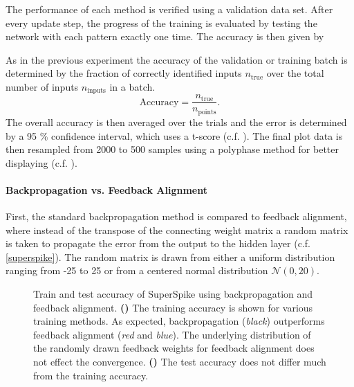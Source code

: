 The performance of each method is verified using a validation data set. After every update step, the progress of the training is evaluated by testing the network with each pattern exactly one time. The accuracy is then given by 

As in the previous experiment the accuracy of the validation or training batch is determined by the fraction of correctly identified inputs $n_\text{true}$ over the total number of inputs $n_\text{inputs}$ in a batch.
\begin{equation}
\text{Accuracy} = \frac{n_\text{true}}{n_\text{points}}.
\end{equation}
The overall accuracy is then averaged over the trials and the error is determined by a 95 \% confidence interval, which uses a t-score (c.f. \citealp{Smithson2011}). The final plot data is then resampled from 2000 to 500 samples using a polyphase method for better displaying (c.f. \citealp{scipypolyresample}).

\paragraph{Backpropagation vs. Feedback Alignment}
First, the standard backpropagation method is compared to feedback alignment, where instead of the transpose of the connecting weight matrix a random matrix is taken to propagate the error from the output to the hidden layer (c.f. \cref{superspike}). The random matrix is drawn from either a uniform distribution ranging from -25 to 25 or from a centered normal distribution $\mathcal{N}(0, 20)$.

\begin{figure}
	\begin{subfigure}[c]{0.5\textwidth}
		\centering
		\caption{}
		
		\label{bptrain73}
	\end{subfigure}	
	\begin{subfigure}[c]{0.5\textwidth}
		\centering
		\caption{}
		
		\label{bptest73}
	\end{subfigure}
	\caption[Train and test accuracy of SuperSpike using backpropagation and feedback alignment.]{Train and test accuracy of SuperSpike using backpropagation and feedback alignment. \textbf{()} The training accuracy is shown for various training methods. As expected, backpropagation (\textit{black}) outperforms feedback alignment (\textit{red} and \textit{blue}). The underlying distribution of the randomly drawn feedback weights for feedback alignment does not effect the convergence. \textbf{()} The test accuracy does not differ much from the training accuracy.}
	\label{BPvsFA73}
\end{figure}

